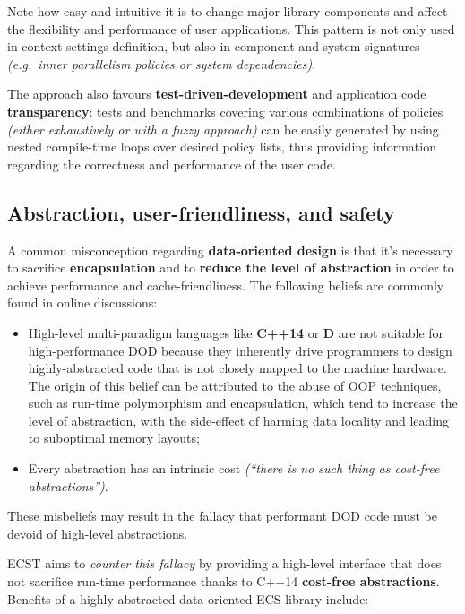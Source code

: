 \documentclass[twoside, 12pt, a4paper, openany]{book}
\begin{document}
Note how easy and intuitive it is to change major library components and
affect the flexibility and performance of user applications. This
pattern is not only used in context settings definition, but also in
component and system signatures \emph{(e.g.~inner parallelism policies
or system dependencies)}.

The approach also favours \textbf{test-driven-development} and
application code \textbf{transparency}: tests and benchmarks covering
various combinations of policies \emph{(either exhaustively or with a
fuzzy approach)} can be easily generated by using nested compile-time
loops over desired policy lists, thus providing information regarding
the correctness and performance of the user code.

\subsection{Abstraction, user-friendliness, and
safety}\label{abstraction-user-friendliness-and-safety}

A common misconception regarding \textbf{data-oriented design} is that
it's necessary to sacrifice \textbf{encapsulation} and to \textbf{reduce
the level of abstraction} in order to achieve performance and
cache-friendliness. The following beliefs are commonly found in online
discussions:

\begin{itemize}
\item
  High-level multi-paradigm languages like \textbf{C++14} or \textbf{D}
  are not suitable for high-performance DOD because they inherently
  drive programmers to design highly-abstracted code that is not closely
  mapped to the machine hardware. The origin of this belief can be
  attributed to the abuse of OOP techniques, such as run-time
  polymorphism and encapsulation, which tend to increase the level of
  abstraction, with the side-effect of harming data locality and leading
  to suboptimal memory layouts;
\item
  Every abstraction has an intrinsic cost \emph{(``there is no such
  thing as cost-free abstractions'')}.
\end{itemize}

These misbeliefs may result in the fallacy that performant DOD code must
be devoid of high-level abstractions.

ECST aims to \emph{counter this fallacy} by providing a high-level
interface that does not sacrifice run-time performance thanks to C++14
\textbf{cost-free abstractions}. Benefits of a highly-abstracted
data-oriented ECS library include:
\end{document}
